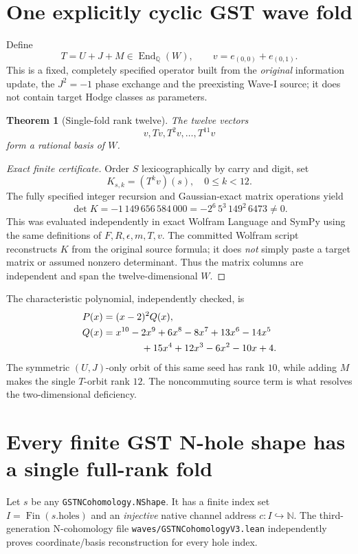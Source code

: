 \documentclass[11pt]{article}
\newtheorem{theorem}{Theorem}
\newcommand{\QQ}{\mathbb Q}
\begin{document}
\section{One explicitly cyclic GST wave fold}

Define
\[
 \boxed{T=U+J+M\in\operatorname{End}_{\QQ}(W)},\qquad
 v=e_{(0,0)}+e_{(0,1)}.
\]
This is a fixed, completely specified operator built from the \emph{original} information update, the \(J^2=-1\) phase exchange and the preexisting Wave-I source; it does not contain target Hodge classes as parameters.

\begin{theorem}[Single-fold rank twelve]\label{th:rank12}
The twelve vectors
\[
 v,Tv,T^2v,\ldots,T^{11}v
\]
form a rational basis of \(W\).
\end{theorem}
\begin{proof}[Exact finite certificate]
Order \(S\) lexicographically by carry and digit, set
\[
 K_{s,k}=(T^kv)(s),\quad 0\le k<12.
\]
The fully specified integer recursion and Gaussian-exact matrix operations yield
\[
 \boxed{\det K=-1\,149\,656\,584\,000=-2^6\,5^3\,149^2\,6473\ne0.}
\]
This was evaluated independently in exact Wolfram Language and SymPy using the same definitions of \(F,R,\epsilon,m,T,v\).
The committed Wolfram script reconstructs \(K\) from the original source formula; it does \emph{not} simply paste a target matrix or assumed nonzero determinant. Thus the matrix columns are independent and span the twelve-dimensional \(W\).
\end{proof}

The characteristic polynomial, independently checked, is
\[
\begin{split}
 P(x)&=(x-2)^2 Q(x),\\
 Q(x)&=x^{10}-2x^9+6x^8-8x^7+13x^6-14x^5\\
 &\hspace{14mm}+15x^4+12x^3-6x^2-10x+4 .
\end{split}
\]
The symmetric \((U,J)\)-only orbit of this same seed has rank \(10\), while adding \(M\) makes the single \(T\)-orbit rank \(12\). The noncommuting source term is what resolves the two-dimensional deficiency.

\section{Every finite GST N-hole shape has a single full-rank fold}

Let \(s\) be any \texttt{GSTNCohomology.NShape}. It has a finite index set
\(I=\operatorname{Fin}(s.\mathrm{holes})\) and an \emph{injective} native channel address
\(c:I\hookrightarrow\mathbb N\).
The third-generation N-cohomology file
\texttt{waves/GSTNCohomologyV3.lean} independently proves coordinate/basis reconstruction for every hole index.
\end{document}
